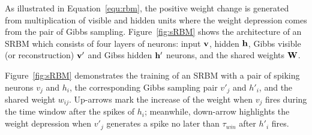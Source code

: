 As illustrated in Equation~\ref{equ:rbm}, the positive weight change is generated from multiplication of visible and hidden units where the weight depression comes from the pair of Gibbs sampling.
Figure~\ref{fig:sRBM} shows the architecture of an SRBM which consists of four layers of neurons: input $\bf{v}$, hidden $\bf{h}$, Gibbs visible (or reconstruction) $\bf{v'}$ and Gibss hidden $\bf{h'}$ neurons, and the shared weights $\bf{W}$.

Figure~\ref{fig:sRBM} demonstrates the training of an SRBM with a pair of spiking neurons $v_j$ and $h_i$, the corresponding Gibbs sampling pair $v'_j$ and $h'_i$, and the shared weight $w_{ij}$.
Up-arrows mark the increase of the weight when $v_j$ fires during the time window after the spikes of $h_i$;
meanwhile, down-arrow highlights the weight depression when $v'_j$ generates a spike no later than $\tau_{win}$ after $h'_i$ fires.





